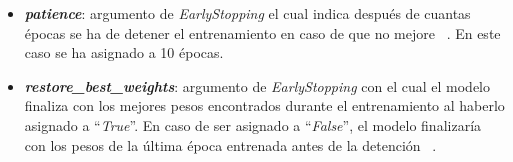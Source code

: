 \begin{itemize}
    \item \textbf{\textit{patience}}: argumento de \textit{EarlyStopping} el cual indica después de cuantas épocas se ha de detener el entrenamiento en caso de que no mejore ~\cite{kerasearly24}. En este caso se ha asignado a 10 épocas.
    \item \textbf{\textit{restore\_best\_weights}}: argumento de \textit{EarlyStopping} con el cual el modelo finaliza con los mejores pesos encontrados durante el entrenamiento al haberlo asignado a ``\textit{True}''. En caso de ser asignado a ``\textit{False}'', el modelo finalizaría con los pesos de la última época entrenada antes de la detención ~\cite{kerasearly24}.

    
\end{itemize}




